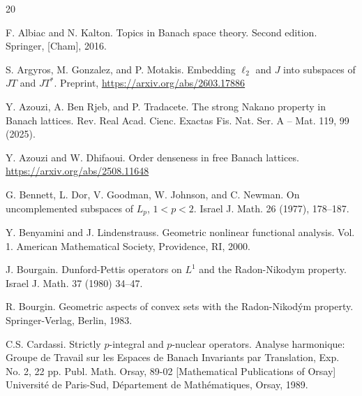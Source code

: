 \documentclass{amsart}
\theoremstyle{plain}
\theoremstyle{definition}
\numberwithin{equation}{section}
\begin{document}


\begin{thebibliography}{20}

 F. Albiac and N. Kalton.
Topics in Banach space theory. Second edition. %
Springer, [Cham], 2016. %

 S. Argyros, M. Gonzalez, and P. Motakis.
Embedding $\ell_2$ and $J$ into subspaces of $JT$ and $JT^*$. Preprint, \url{https://arxiv.org/abs/2603.17886}


 Y. Azouzi, A. Ben Rjeb, and P. Tradacete.
The strong Nakano property in Banach lattices.
Rev. Real Acad. Cienc. Exactas Fis. Nat. Ser. A -- Mat. 119, 99 (2025).

 Y. Azouzi and W. Dhifaoui.
Order denseness in free Banach lattices.
\url{https://arxiv.org/abs/2508.11648}

G. Bennett, L. Dor, V. Goodman, W. Johnson, and C. Newman.
On uncomplemented subspaces of $L_p$, $1<p<2$.
Israel J. Math. 26 (1977), 178--187.

 Y. Benyamini and J. Lindenstrauss.
Geometric nonlinear functional analysis. Vol. 1. %
American Mathematical Society, Providence, RI, 2000. %

 J. Bourgain. 
Dunford-Pettis operators on $L^1$ and the Radon-Nikodym property.
Israel J. Math. 37 (1980) 34--47.

 R. Bourgin. Geometric aspects of convex sets with the Radon-Nikod\'ym property.
Springer-Verlag, Berlin, 1983. %

 C.S. Cardassi.
Strictly $p$-integral and $p$-nuclear operators. Analyse harmonique: Groupe de Travail sur les Espaces de Banach Invariants par Translation, Exp. No. 2, 22 pp.
Publ. Math. Orsay, 89-02 [Mathematical Publications of Orsay]
Universit\'e de Paris-Sud, D{\'e}partement de Mathématiques, Orsay, 1989.


\end{thebibliography}
\end{document}
